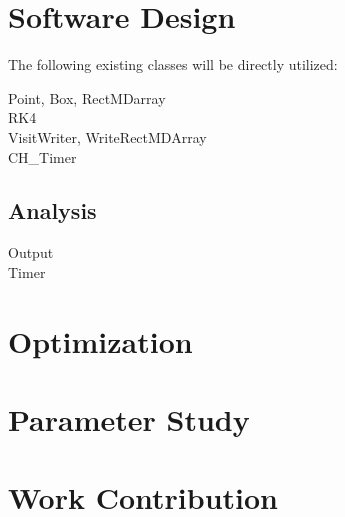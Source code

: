 \documentclass{article}
\begin{document}
\section{Software Design}
The following existing classes will be directly utilized:
\begin{description}
\item[Point, Box, RectMDarray]
\item[RK4]
\item[VisitWriter, WriteRectMDArray]
\item[CH\_Timer]
\end{description}

\subsection{Analysis}
\begin{description}
\item[Output]
\item[Timer]
\end{description} 
	
\section{Optimization}
\section{Parameter Study} 
\section{Work Contribution} 
\end{document}
